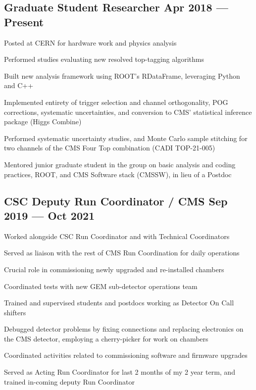 \documentclass[letter,10pt]{article}
\begin{document}
\subsection{{Graduate Student Researcher \hfill Apr 2018 --- Present}}
\begin{zitemize}
\item Posted at CERN for hardware work and physics analysis
\item Performed studies evaluating new resolved top-tagging algorithms
\item Built new analysis framework using ROOT's RDataFrame, leveraging Python and C++
\item Implemented entirety of trigger selection and channel orthogonality, POG corrections, systematic uncertainties, and conversion to CMS' statistical inference package (Higgs Combine)
\item Performed systematic uncertainty studies, and Monte Carlo sample stitching for two channels of the CMS Four Top combination (CADI TOP-21-005)
\item Mentored junior graduate student in the group on basic analysis and coding practices, ROOT, and CMS Software stack (CMSSW), in lieu of a Postdoc
\end{zitemize}

\subsection{{CSC Deputy Run Coordinator / CMS \hfill Sep 2019 --- Oct 2021}}
\begin{zitemize}
\item Worked alongside CSC Run Coordinator and with Technical Coordinators
\item Served as liaison with the rest of CMS Run Coordination for daily operations
\item Crucial role in commissioning newly upgraded and re-installed chambers
\item Coordinated tests with new GEM sub-detector operations team
\item Trained and supervised students and postdocs working as Detector On Call shifters
\item Debugged detector problems by fixing connections and replacing electronics on the CMS detector, employing a cherry-picker for work on chambers
\item Coordinated activities related to commissioning software and firmware upgrades
\item Served as Acting Run Coordinator for last 2 months of my 2 year term, and trained in-coming deputy Run Coordinator
\end{zitemize}
\end{document}
